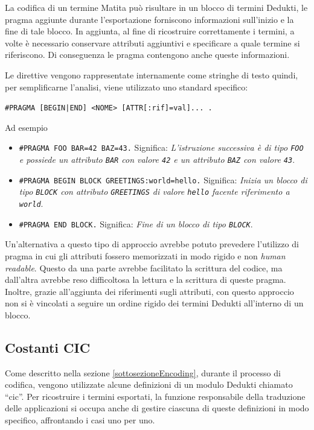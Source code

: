 \documentclass[12pt,a4paper]{mimosis}
\begin{document}
La codifica di un termine Matita può risultare in un blocco di termini Dedukti,
le pragma aggiunte durante l'esportazione forniscono informazioni sull'inizio e la fine di tale blocco.
In aggiunta, al fine di ricostruire correttamente i termini, a volte è necessario
conservare attributi aggiuntivi e specificare a quale termine si riferiscono.
Di conseguenza le pragma contengono anche queste informazioni.

Le direttive vengono rappresentate internamente come stringhe di testo quindi, per
semplificarne l'analisi, viene utilizzato uno standard specifico:
\begin{center}
  \texttt{\#PRAGMA [BEGIN|END] <NOME> [ATTR[:rif]=val]... .}
\end{center}

Ad esempio
\begin{itemize}
  \item  \texttt{\#PRAGMA FOO BAR=42 BAZ=43.} Significa: \textit{L'istruzione successiva è di tipo
    \texttt{FOO} e possiede un attributo \texttt{BAR} con valore \texttt{42} e 
    un attributo \texttt{BAZ} con valore \texttt{43}}.

  \item  \texttt{\#PRAGMA BEGIN BLOCK GREETINGS:world=hello.} Significa: \textit{
    Inizia un blocco di tipo \texttt{BLOCK} con attributo \texttt{GREETINGS} di 
    valore \texttt{hello} facente riferimento a \texttt{world}}.

  \item  \texttt{\#PRAGMA END BLOCK.} Significa: \textit{Fine di un blocco di tipo
    \texttt{BLOCK}}.
\end{itemize}

Un'alternativa a questo tipo di approccio avrebbe potuto prevedere l'utilizzo
di pragma in cui gli attributi fossero memorizzati in modo rigido e non
\textit{human readable}. Questo da una parte avrebbe facilitato la scrittura
del codice, ma dall'altra avrebbe reso difficoltosa la lettura e la scrittura di
queste pragma.
Inoltre, grazie all'aggiunta dei riferimenti sugli attributi, con questo approccio
non si è vincolati a seguire un ordine rigido dei termini Dedukti all'interno di 
un blocco.

\subsection{Costanti CIC}
Come descritto nella sezione \ref{sottosezioneEncoding}, durante il processo di
codifica, vengono utilizzate alcune definizioni di un modulo Dedukti chiamato
``cic''. Per ricostruire i termini esportati, la funzione
responsabile della traduzione delle applicazioni si occupa anche di gestire ciascuna
di queste definizioni in modo specifico, affrontando i casi uno per uno. 
\end{document}
